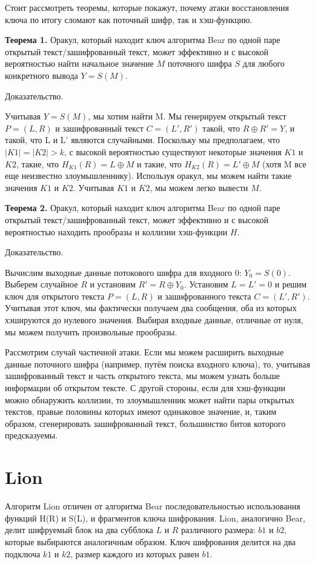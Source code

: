 \documentclass[12pt]{article}
\begin{document}
Стоит рассмотреть теоремы, которые покажут, почему атаки восстановления ключа по итогу сломают как поточный шифр, так и хэш-функцию.    

\vspace{5mm}
\textbf{Теорема 1.} Оракул, который находит ключ алгоритма Bear по одной паре открытый текст/зашифрованный текст, может эффективно и с высокой вероятностью найти начальное значение $M$ поточного шифра $S$ для любого конкретного вывода $Y = S(M)$.

Доказательство. 

Учитывая $Y = S (M)$, мы хотим найти M. Мы генерируем открытый текст $P = (L, R)$
и зашифрованный текст $C = (L', R')$ такой, что $R \oplus R' = Y$, и такой, что L и L'
являются случайными. Поскольку мы предполагаем, что $|K1| = |K2| > k$, с высокой вероятностью
существуют некоторые значения $K1$ и $K2$, такие, что $H_{K1}(R) = L \oplus M$ и такие, что
$H_{K2}(R) = L' \oplus M$ (хотя M все еще неизвестно злоумышленнику). Используя
оракул, мы можем найти такие значения $K1$ и $K2$. Учитывая $K1$ и $K2$, мы можем легко
вывести $M$.

\vspace{5mm}
\textbf{Теорема 2.} Оракул, который находит ключ алгоритма Bear по одной паре открытый текст/зашифрованный текст, может эффективно и с высокой вероятностью находить прообразы и коллизии
хэш-функции $H$.

Доказательство. 

Вычислим выходные данные потокового шифра для входного 0: $Y_{0} = S(0)$.
Выберем случайное $R$ и установим $R' = R \oplus Y_{0}$. Установим $L = L' = 0$ и решим ключ для открытого текста $P = (L, R)$ и зашифрованного текста $C = (L', R')$. Учитывая этот ключ, мы фактически получаем два сообщения, оба из которых хэшируются до нулевого значения. Выбирая входные данные, отличные от нуля, мы можем получить произвольные прообразы.

\vspace{5mm}
Рассмотрим случай частичной атаки. Если мы можем расширить выходные данные поточного шифра (например, путём поиска входного ключа), то, учитывая зашифрованный текст и часть открытого текста, мы можем узнать больше информации об открытом тексте. С другой стороны, если для хэш-функции можно обнаружить коллизии, то злоумышленник может найти пары открытых текстов, правые половины которых имеют одинаковое значение, и, таким образом, сгенерировать зашифрованный текст, большинство битов которого предсказуемы.


\section{Lion}
Алгоритм Lion отличен от алгоритма Bear последовательностью использования функций H(R) и S(L), и фрагментов ключа шифрования. Lion, аналогично Bear, делит шифруемый блок на два субблока $L$ и $R$ различного размера: $b1$ и $b2$, которые выбираются аналогичным образом. Ключ шифрования делится на два подключа $k1$ и $k2$, размер каждого из которых равен $b1$.
\end{document}
